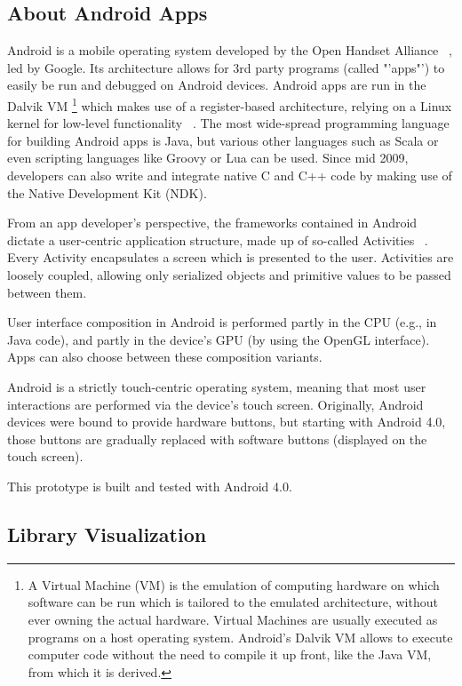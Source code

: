 \subsection{About Android Apps}

Android is a mobile operating system developed by the Open Handset Alliance ~\cite{url:openhandsetalliance}, led by Google. Its architecture allows for 3rd party programs (called "'apps"') to easily be run and debugged on Android devices.
Android apps are run in the Dalvik VM \footnote{A Virtual Machine (VM) is the emulation of computing hardware on which software can be run which is tailored to the emulated architecture, without ever owning the actual hardware. Virtual Machines are usually executed as programs on a host operating system. Android's Dalvik VM allows to execute computer code without the need to compile it up front, like the Java VM, from which it is derived.} which makes use of a register-based architecture, relying on a Linux kernel for low-level functionality ~\cite{dalvik}. The most wide-spread programming language for building Android apps is Java, but various other languages such as Scala or even scripting languages like Groovy or Lua can be used. Since mid 2009, developers can also write and integrate native C and C++ code by making use of the Native Development Kit (NDK).

From an app developer's perspective, the frameworks contained in Android dictate a user-centric application structure, made up of so-called Activities ~\cite{url:androidactivity}. Every Activity encapsulates a screen which is presented to the user. Activities are loosely coupled, allowing only serialized objects and primitive values to be passed between them.

User interface composition in Android is performed partly in the CPU (e.g., in Java code), and partly in the device's GPU (by using the OpenGL interface). Apps can also choose between these composition variants.

Android is a strictly touch-centric operating system, meaning that most user interactions are performed via the device's touch screen. Originally, Android devices were bound to provide hardware buttons, but starting with Android 4.0, those buttons are gradually replaced with software buttons (displayed on the touch screen).

This prototype is built and tested with Android 4.0.

\subsection{Library Visualization}

